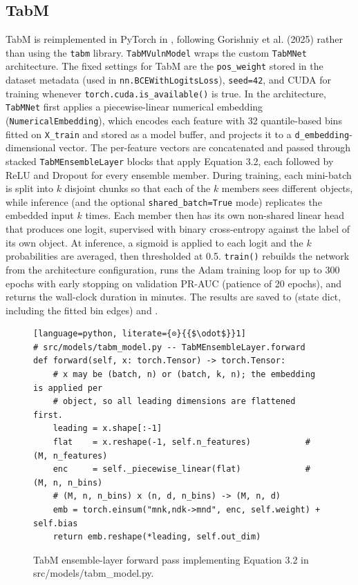 \subsection{TabM}

TabM is reimplemented in PyTorch in , following Gorishniy et al. (2025) rather than using the \texttt{tabm} library. \texttt{TabMVulnModel} wraps the custom \texttt{TabMNet} architecture. The fixed settings for TabM are the \texttt{pos\_weight} stored in the dataset metadata (used in \texttt{nn.BCEWithLogitsLoss}), \texttt{seed=42}, and CUDA for training whenever \texttt{torch.cuda.is\_available()} is true. In the architecture, \texttt{TabMNet} first applies a piecewise-linear numerical embedding (\texttt{NumericalEmbedding}), which encodes each feature with 32 quantile-based bins fitted on \texttt{X\_train} and stored as a model buffer, and projects it to a \texttt{d\_embedding}-dimensional vector. The per-feature vectors are concatenated and passed through stacked \texttt{TabMEnsembleLayer} blocks that apply Equation 3.2, each followed by ReLU and Dropout for every ensemble member. During training, each mini-batch is split into $k$ disjoint chunks so that each of the $k$ members sees different objects, while inference (and the optional \texttt{shared\_batch=True} mode) replicates the embedded input $k$ times. Each member then has its own non-shared linear head that produces one logit, supervised with binary cross-entropy against the label of its own object. At inference, a sigmoid is applied to each logit and the $k$ probabilities are averaged, then thresholded at 0.5. \texttt{train()} rebuilds the network from the architecture configuration, runs the Adam training loop for up to 300 epochs with early stopping on validation PR-AUC (patience of 20 epochs), and returns the wall-clock duration in minutes. The results are saved to  (state dict, including the fitted bin edges) and .

\begin{figure}[H]
  \centering
\begin{lstlisting}[language=python, literate={⊙}{{$\odot$}}1]
# src/models/tabm_model.py -- TabMEnsembleLayer.forward
def forward(self, x: torch.Tensor) -> torch.Tensor:
    # x may be (batch, n) or (batch, k, n); the embedding is applied per
    # object, so all leading dimensions are flattened first.
    leading = x.shape[:-1]
    flat    = x.reshape(-1, self.n_features)           # (M, n_features)
    enc     = self._piecewise_linear(flat)             # (M, n, n_bins)
    # (M, n, n_bins) x (n, d, n_bins) -> (M, n, d)
    emb = torch.einsum("mnk,ndk->mnd", enc, self.weight) + self.bias
    return emb.reshape(*leading, self.out_dim)
\end{lstlisting}
  \caption{TabM ensemble-layer forward pass implementing Equation 3.2 in src/models/tabm\_model.py.}
  \label{fig:tabm-forward-pass}
\end{figure}

